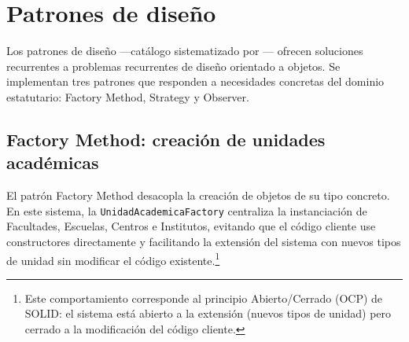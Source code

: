 \section{Patrones de diseño}
\label{sec:java-patrones}

\noindent
Los patrones de diseño ---catálogo sistematizado por \textcite{Gamma1994}--- ofrecen
soluciones recurrentes a problemas recurrentes de diseño orientado a objetos. Se
implementan tres patrones que responden a necesidades concretas del dominio
estatutario: Factory Method, Strategy y Observer.

\subsection{Factory Method: creación de unidades académicas}

El patrón Factory Method desacopla la creación de objetos de su tipo concreto.
En este sistema, la \texttt{UnidadAcademicaFactory} centraliza la instanciación
de Facultades, Escuelas, Centros e Institutos, evitando que el código cliente
use constructores directamente y facilitando la extensión del sistema con nuevos
tipos de unidad sin modificar el código existente.\footnote{Este comportamiento
corresponde al principio Abierto/Cerrado (OCP) de SOLID: el sistema está abierto
a la extensión (nuevos tipos de unidad) pero cerrado a la modificación del código cliente.}

